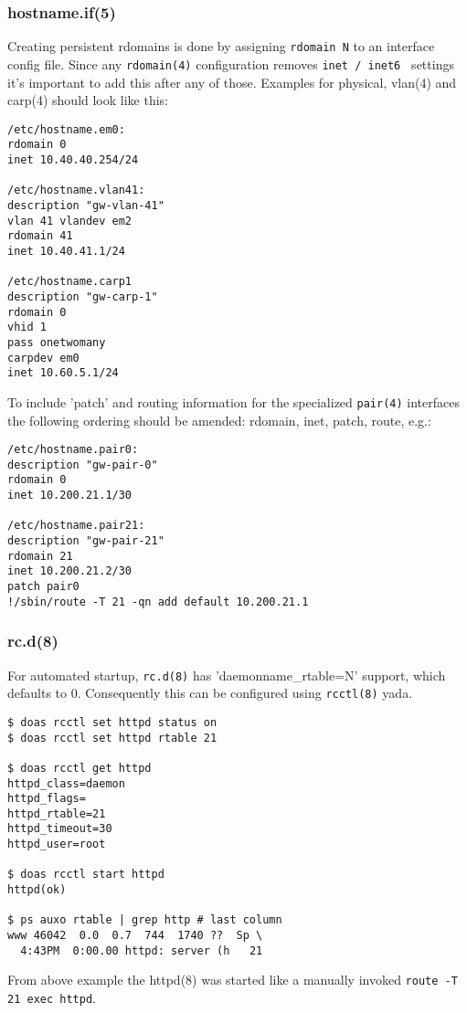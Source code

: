 \documentclass[letterpaper,twocolumn,10pt]{article}
\begin{document}
\subsubsection{hostname.if(5)}
Creating persistent rdomains is done by assigning {\tt rdomain N} to an interface config file. Since any  {\tt rdomain(4)} configuration removes  {\tt inet / inet6 } settings it's important to add this after any of those. Examples for physical, vlan(4) and carp(4) should look like this:
\begin{verbatim}
/etc/hostname.em0:
rdomain 0
inet 10.40.40.254/24

/etc/hostname.vlan41:
description "gw-vlan-41"
vlan 41 vlandev em2
rdomain 41
inet 10.40.41.1/24

/etc/hostname.carp1
description "gw-carp-1"
rdomain 0
vhid 1
pass onetwomany
carpdev em0
inet 10.60.5.1/24
\end{verbatim}
To include 'patch' and routing information for the specialized {\tt pair(4)} interfaces the following ordering should be amended: rdomain, inet, patch, route, e.g.:
\begin{verbatim}
/etc/hostname.pair0:
description "gw-pair-0"
rdomain 0
inet 10.200.21.1/30

/etc/hostname.pair21:
description "gw-pair-21"
rdomain 21
inet 10.200.21.2/30
patch pair0
!/sbin/route -T 21 -qn add default 10.200.21.1
\end{verbatim}

\subsubsection{rc.d(8)}
For automated startup, {\tt rc.d(8)} has 'daemonname\_rtable=N' support, which defaults to 0. Consequently this can be configured using {\tt rcctl(8)} yada.

\begin{verbatim}
$ doas rcctl set httpd status on
$ doas rcctl set httpd rtable 21

$ doas rcctl get httpd
httpd_class=daemon
httpd_flags=
httpd_rtable=21
httpd_timeout=30
httpd_user=root

$ doas rcctl start httpd
httpd(ok)

$ ps auxo rtable | grep http # last column
www 46042  0.0  0.7  744  1740 ??  Sp \
  4:43PM  0:00.00 httpd: server (h   21

\end{verbatim}
From above example the httpd(8) was started like a manually invoked {\tt route -T 21 exec httpd}.
\end{document}
